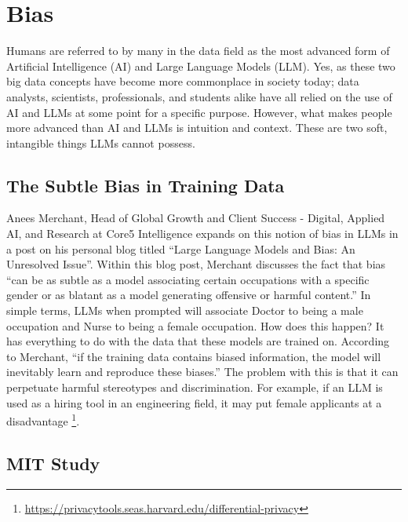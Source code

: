 \documentclass[
]{book}
\begin{document}
\hypertarget{bias}{%
\chapter{Bias}\label{bias}}

Humans are referred to by many in the data field as the most advanced form of Artificial Intelligence (AI) and Large Language Models (LLM). Yes, as these two big data concepts have become more commonplace in society today; data analysts, scientists, professionals, and students alike have all relied on the use of AI and LLMs at some point for a specific purpose. However, what makes people more advanced than AI and LLMs is intuition and context. These are two soft, intangible things LLMs cannot possess.

\hypertarget{the-subtle-bias-in-training-data}{%
\section{The Subtle Bias in Training Data}\label{the-subtle-bias-in-training-data}}

Anees Merchant, Head of Global Growth and Client Success - Digital, Applied AI, and Research at Core5 Intelligence expands on this notion of bias in LLMs in a post on his personal blog titled ``Large Language Models and Bias: An Unresolved Issue''. Within this blog post, Merchant discusses the fact that bias ``can be as subtle as a model associating certain occupations with a specific gender or as blatant as a model generating offensive or harmful content.'' In simple terms, LLMs when prompted will associate Doctor to being a male occupation and Nurse to being a female occupation. How does this happen? It has everything to do with the data that these models are trained on. According to Merchant, ``if the training data contains biased information, the model will inevitably learn and reproduce these biases.'' The problem with this is that it can perpetuate harmful stereotypes and discrimination. For example, if an LLM is used as a hiring tool in an engineering field, it may put female applicants at a disadvantage \footnote{\url{https://privacytools.seas.harvard.edu/differential-privacy}}.

\hypertarget{mit-study}{%
\section{MIT Study}\label{mit-study}}
\end{document}
